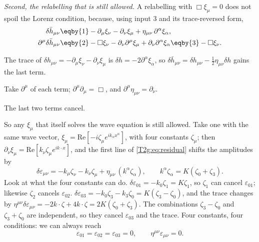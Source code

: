 \emph{Second, the relabelling that is still allowed.} A relabelling with $\Box\xi_\mu=0$ does not spoil the Lorenz condition, because, using input 3 and its trace-reversed form,
\begin{align}
  \delta\bar h_{\mu\nu}
  &\eqby{1}-\partial_\mu\xi_\nu-\partial_\nu\xi_\mu+\eta_{\mu\nu}\,\partial^\alpha\xi_\alpha,\nonumber\\
  \partial^\mu\delta\bar h_{\mu\nu}
  &\eqby{2}-\Box\xi_\nu-\partial_\nu\partial^\mu\xi_\mu+\partial_\nu\partial^\alpha\xi_\alpha
  \eqby{3}-\Box\xi_\nu .
  \label{T2g:eq:residual}
\end{align}
\begin{explain}
  \item The trace of $\delta h_{\mu\nu}=-\partial_\mu\xi_\nu-\partial_\nu\xi_\mu$ is $\delta h=-2\partial^\alpha\xi_\alpha$, so $\delta\bar h_{\mu\nu}=\delta h_{\mu\nu}-\tfrac12\eta_{\mu\nu}\delta h$ gains the last term.
  \item Take $\partial^\mu$ of each term; $\partial^\mu\partial_\mu=\Box$, and $\partial^\mu\eta_{\mu\nu}=\partial_\nu$.
  \item The last two terms cancel.
\end{explain}
So any $\xi_\mu$ that itself solves the wave equation is still allowed. Take one with the same wave vector, $\xi_\mu=\mathrm{Re}[-i\zeta_\mu e^{ik_\alpha x^\alpha}]$, with four constants $\zeta_\mu$; then $\partial_\nu\xi_\mu=\mathrm{Re}[k_\nu\zeta_\mu e^{ik\cdot x}]$, and the first line of \eqref{T2g:eq:residual} shifts the amplitudes by
\begin{equation}
  \delta\varepsilon_{\mu\nu}=-k_\mu\zeta_\nu-k_\nu\zeta_\mu+\eta_{\mu\nu}\,(k^\alpha\zeta_\alpha),
  \qquad k^\alpha\zeta_\alpha=K(\zeta_0+\zeta_3).
\end{equation}
Look at what the four constants can do. $\delta\varepsilon_{01}=-k_0\zeta_1=K\zeta_1$, so $\zeta_1$ can cancel $\varepsilon_{01}$; likewise $\zeta_2$ cancels $\varepsilon_{02}$. $\delta\varepsilon_{03}=-k_0\zeta_3-k_3\zeta_0=K(\zeta_3-\zeta_0)$, and the trace changes by $\eta^{\mu\nu}\delta\varepsilon_{\mu\nu}=-2k\cdot\zeta+4k\cdot\zeta=2K(\zeta_0+\zeta_3)$. The combinations $\zeta_3-\zeta_0$ and $\zeta_3+\zeta_0$ are independent, so they cancel $\varepsilon_{03}$ and the trace. Four constants, four conditions: we can always reach
\begin{equation}
  \varepsilon_{01}=\varepsilon_{02}=\varepsilon_{03}=0,\qquad \eta^{\mu\nu}\varepsilon_{\mu\nu}=0 .
  \label{T2g:eq:tt-choice}
\end{equation}

